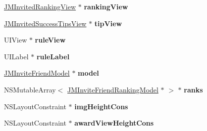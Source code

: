 \begin{DoxyCompactItemize}
\item 
\mbox{\label{category_j_m_invite_friends_controller_07_08_ab501bdd1944511c6e452612369b1fdea}} 
\mbox{\hyperlink{interface_j_m_invited_ranking_view}{J\+M\+Invited\+Ranking\+View}} $\ast$ {\bfseries ranking\+View}
\item 
\mbox{\label{category_j_m_invite_friends_controller_07_08_a067860e4c82b9598910bb3e4974510a7}} 
\mbox{\hyperlink{interface_j_m_invited_success_tips_view}{J\+M\+Invited\+Success\+Tips\+View}} $\ast$ {\bfseries tip\+View}
\item 
\mbox{\label{category_j_m_invite_friends_controller_07_08_a2e3d4d6fd8f92b5b90f2a978cc94df94}} 
U\+I\+View $\ast$ {\bfseries rule\+View}
\item 
\mbox{\label{category_j_m_invite_friends_controller_07_08_a034737a49571d8e7553a7aa5652eb62d}} 
U\+I\+Label $\ast$ {\bfseries rule\+Label}
\item 
\mbox{\label{category_j_m_invite_friends_controller_07_08_a88cff419112b325dfd0caf338b18ffd7}} 
\mbox{\hyperlink{interface_j_m_invite_friend_model}{J\+M\+Invite\+Friend\+Model}} $\ast$ {\bfseries model}
\item 
\mbox{\label{category_j_m_invite_friends_controller_07_08_a1023fd4095f6886113f764f2915fd895}} 
N\+S\+Mutable\+Array$<$ \mbox{\hyperlink{interface_j_m_invite_friend_ranking_model}{J\+M\+Invite\+Friend\+Ranking\+Model}} $\ast$ $>$ $\ast$ {\bfseries ranks}
\item 
\mbox{\label{category_j_m_invite_friends_controller_07_08_ad5b21f76def03b0729a0271689eaca92}} 
N\+S\+Layout\+Constraint $\ast$ {\bfseries img\+Height\+Cons}
\item 
\mbox{\label{category_j_m_invite_friends_controller_07_08_a11e9f1b733757aa2322f0e6b6895a4e0}} 
N\+S\+Layout\+Constraint $\ast$ {\bfseries award\+View\+Height\+Cons}
\item 

\end{DoxyCompactItemize}
